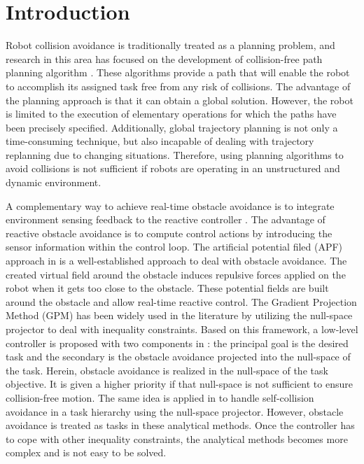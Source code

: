 
\section{Introduction}
\label{sec:motion intro}
Robot collision avoidance is traditionally treated as a planning problem, and research in this area has focused on the development of collision-free path planning algorithm \cite{gouzenes1984,lumelsky1987,hsu2002,gonzalez2006}. These algorithms provide a path that will enable the robot to accomplish its assigned task free from any risk of collisions. The advantage of the planning approach is that it can obtain a global solution. However, the robot is limited to the execution of elementary operations for which the paths have been precisely specified. Additionally, global trajectory planning is not only a time-consuming technique, but also incapable of dealing with trajectory replanning due to changing situations. Therefore, using planning algorithms to avoid collisions is not sufficient if robots are operating in an unstructured and dynamic environment.

A complementary way to achieve real-time obstacle avoidance is to integrate environment sensing feedback to the reactive controller . The advantage of reactive obstacle avoidance is to compute control actions by introducing the sensor information within the control loop. The artificial potential filed (APF) approach in \cite{khatib1986} is a well-established approach to deal with obstacle avoidance. The created virtual field around the obstacle induces repulsive forces applied on the robot when it gets too close to the obstacle. These potential fields are built around the obstacle and allow real-time reactive control. The Gradient Projection Method (GPM) \cite{liegeois1977} has been widely used in the literature by utilizing the null-space projector to deal with inequality constraints. Based on this framework, a low-level controller is proposed with two components in \cite{maciejewski1985, brock2002}: the principal goal is the desired task and the secondary is the obstacle avoidance projected into the null-space of the task. Herein, obstacle avoidance is realized in the null-space of the task objective. It is given a higher priority if that null-space is not sufficient to ensure collision-free motion. The same idea is applied in \cite{stasse2008,sugiura2010,dietrich2012b} to handle self-collision avoidance in a task hierarchy using the null-space projector. However, obstacle avoidance is treated as tasks in these analytical methods. Once the controller has to cope with other inequality constraints, the analytical methods becomes more complex and is not easy to be solved.

